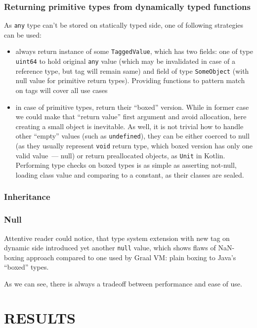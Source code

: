 \documentclass[times, %
	specification,annotation, %
	titlepage-extra-ru,specification-extra-ru,annotation-extra-ru, %
	languages={russian,english} %
	]{itmo-student-thesis}
\begin{document}
\subsection{Returning primitive types from dynamically typed functions}
As \texttt{any} type can't be stored on statically typed side, one of following strategies can be used:\\
\begin{itemize}
	\item always return instance of some \texttt{TaggedValue}, which has two fields: one of type \texttt{uint64} to hold original \texttt{any} value (which may be invalidated in case of a reference type, but tag will remain same) and field of type \texttt{SomeObject} (with null value for primitive return types). Providing functions to pattern match on tags will cover all use cases
	\item in case of primitive types, return their ``boxed'' version. While in former case we could make that ``return value'' first argument and avoid allocation, here creating a small object is inevitable. As well, it is not trivial how to handle other ``empty'' values (such as \texttt{undefined}), they can be either coerced to null (as they usually represent \texttt{void} return type, which boxed version has only one valid value~--- null) or return preallocated objects, as \texttt{Unit} in Kotlin. Performing type checks on boxed types is as simple as asserting not-null, loading class value and comparing to a constant, as their classes are sealed.
\end{itemize}
\subsection{Inheritance}
\subsection{Null}
Attentive reader could notice, that type system extension with new tag on dynamic side introduced yet another \texttt{null} value, which shows flaws of NaN-boxing approach compared to one used by Graal VM: plain boxing to Java's ``boxed'' types.

\chapterconclusion
As we can see, there is always a tradeoff between performance and ease of use.

\chapter{RESULTS}
\end{document}
